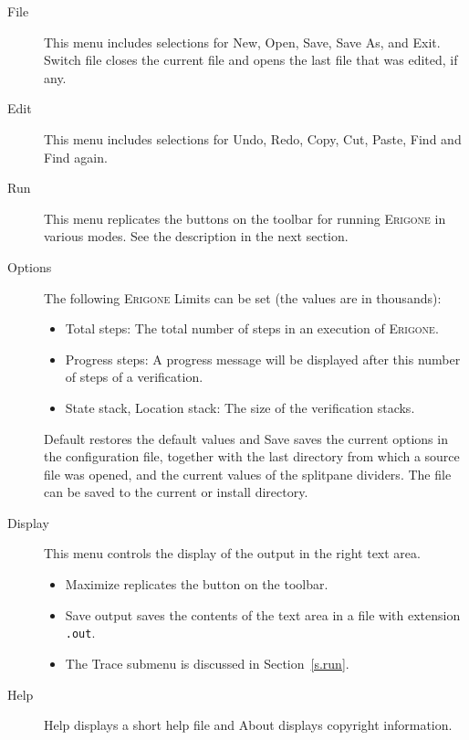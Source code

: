 \documentclass[11pt]{article}
\newcommand{\eri}{\textsc{Erigone}}
\newcommand{\p}[1]{\texttt{#1}}
\newcommand{\bu}[1]{\textsf{#1}}
\begin{document}
\begin{description}
\item[\bu{File}] This menu includes selections for \bu{New}, \bu{Open}, 
\bu{Save}, \bu{Save As}, and \bu{Exit}. \bu{Switch file} closes the 
current file and opens the last file that was edited, if any.

\item[\bu{Edit}] This menu includes selections for \bu{Undo}, \bu{Redo}, 
\bu{Copy}, \bu{Cut}, \bu{Paste}, \bu{Find} and \bu{Find again}.

\item[\bu{Run}] This menu replicates the buttons on the toolbar for
running \eri{} in various modes. See the description in the next
section.

\item[\bu{Options}] The following \eri{} \bu{Limits} can be set (the
values are in thousands):
\begin{itemize}
\item \bu{Total steps}: The total number of steps in an execution of
\eri{}.
\item \bu{Progress steps}: A progress message will be displayed
after this number of steps of a verification.
\item \bu{State stack}, \bu{Location stack}: The size of the
verification stacks.
\end{itemize}

\bu{Default} restores the default values and \bu{Save} saves the current
options in the configuration file, together with the last directory from
which a source file was opened, and the current values of the splitpane
dividers. The file can be saved to the \bu{current} or \bu{install}
directory.

\item[\bu{Display}] This menu controls the display of the output in the
right text area.
\begin{itemize}
\item \bu{Maximize} replicates the button on the toolbar.
\item \bu{Save output} saves the contents of the text area in a file with
extension \p{.out}.
\item The \bu{Trace} submenu is discussed in
Section~\ref{s.run}.
\end{itemize}

\item[\bu{Help}] \bu{Help} displays a short help file and \bu{About} 
displays copyright information.
\end{description}
\end{document}
